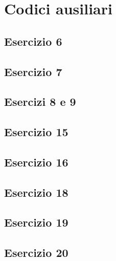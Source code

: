 \section{Codici ausiliari}

\subsection{Esercizio 6}


\subsection{Esercizio 7}


\subsection{Esercizi 8 e 9}


\subsection{Esercizio 15}


\subsection{Esercizio 16}


\subsection{Esercizio 18}


\subsection{Esercizio 19}


\subsection{Esercizio 20}


